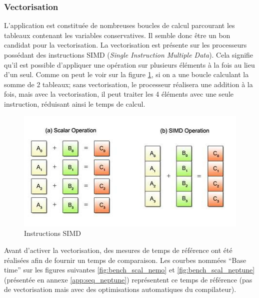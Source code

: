 \subsubsection{Vectorisation}\label{fig:vecto}
L'application est constituée de nombreuses boucles de calcul parcourant les tableaux contenant les variables conservatives. Il semble donc être un bon candidat pour la vectorisation. La vectorisation est présente sur les processeurs possédant des instructions SIMD (\textit{Single Instruction Multiple Data}). Cela signifie qu'il est possible d'appliquer une opération sur plusieurs éléments à la fois au lieu d'un seul. Comme on peut le voir sur la figure \ref{fig:simd}, si on a une boucle calculant la somme de 2 tableaux; sans vectorisation, le processeur réalisera une addition à la fois, mais avec la vectorisation, il peut traiter les 4 éléments avec une seule instruction, réduisant ainsi le temps de calcul.

\begin{figure}[ht]
  \centering
  \includegraphics[scale=0.85]{figures/simd.jpg}
  \caption{\label{fig:simd} Instructions SIMD}
\end{figure}


Avant d'activer la vectorisation, des mesures de temps de référence ont été réalisées afin de fournir un temps de comparaison. Les courbes nommées ``Base time'' sur les figures suivantes \ref{fig:bench_scal_nemo} et \ref{fig:bench_scal_neptune} (présentée en annexe \ref{app:seq_neptune}) représentent ce temps de référence (pas de vectorisation mais avec des optimisations automatiques du compilateur).

